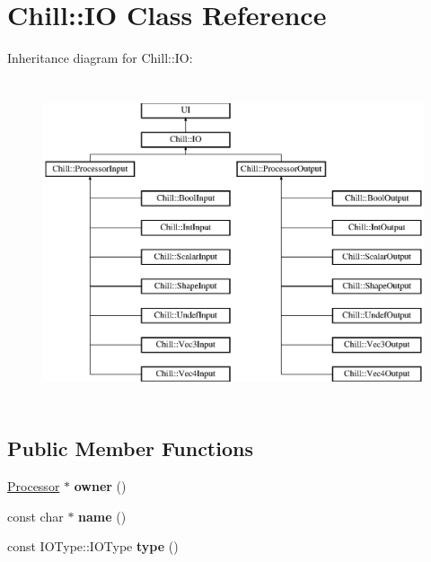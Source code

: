 \hypertarget{class_chill_1_1_i_o}{}\section{Chill\+:\+:IO Class Reference}
\label{class_chill_1_1_i_o}
Inheritance diagram for Chill\+:\+:IO\+:\begin{figure}[H]
\begin{center}
\leavevmode
\includegraphics[height=9.589041cm]{class_chill_1_1_i_o}
\end{center}
\end{figure}
\subsection*{Public Member Functions}
\begin{DoxyCompactItemize}
\item 
\mbox{\label{class_chill_1_1_i_o_ac639842a6d9bfa75a8aecfef6887b6f1}} 
\mbox{\hyperlink{class_chill_1_1_processor}{Processor}} $\ast$ {\bfseries owner} ()
\item 
\mbox{\label{class_chill_1_1_i_o_ad3fc42bb1940d0ca734ec516775cd0fd}} 
const char $\ast$ {\bfseries name} ()
\item 
\mbox{\label{class_chill_1_1_i_o_a9cb1a5df93ba477db683f0a4506d7926}} 
const I\+O\+Type\+::\+I\+O\+Type {\bfseries type} ()
\end{DoxyCompactItemize}
